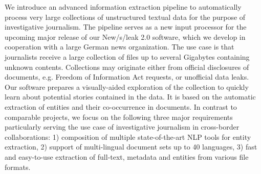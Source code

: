 We introduce an advanced information extraction pipeline to automatically process very large collections of unstructured textual data for the purpose of investigative journalism. The pipeline serves as a new input processor for the upcoming major release of our New/s/leak 2.0 software,  which we develop in cooperation with a large German news organization. The use case is that journalists receive a large collection of files up to several Gigabytes containing unknown contents. Collections may originate either from official disclosures of documents, e.g. Freedom of Information Act requests, or unofficial data leaks. Our software prepares a visually-aided exploration of the collection to quickly learn about potential stories contained in the data. It is based on the automatic extraction of entities and their co-occurrence in documents. In contrast to comparable projects, we focus on the following three major requirements particularly serving the use case of investigative journalism in cross-border collaborations: 1) composition of multiple state-of-the-art NLP tools for entity extraction, 2) support of multi-lingual document sets up to 40 languages, 3) fast and easy-to-use extraction of full-text, metadata and entities from various file formats.
